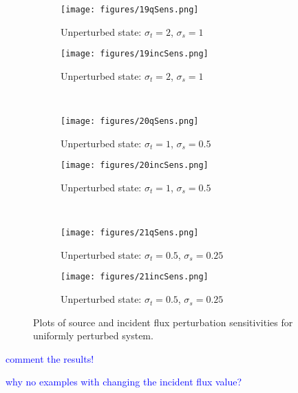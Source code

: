 \documentclass{article}
\newcommand{\sigt}{\sigma_t}
\newcommand{\sigs}{\sigma_s}
\newcommand{\comment}[2]{\marginpar{\textcolor{#2}{$\star$}}\textcolor{#2}{#1}\newline}
\newcommand{\jcr}[1]{\comment{#1}{blue}}
\newcommand{\jcr}[1]{\phantom{a}}
\begin{document}
\begin{figure}[H]
\label{HomoPertq}
\centering
\begin{subfigure}{.5\textwidth}
  \centering
  \texttt{[image: figures/19qSens.png]}
  \caption{Unperturbed state: $\sigt=2$, $\sigs=1$}
  \label{fig:sfig1}
\end{subfigure}%
\begin{subfigure}{.5\textwidth}
  \centering
  \texttt{[image: figures/19incSens.png]}
  \caption{Unperturbed state: $\sigt=2$, $\sigs=1$}
  \label{fig:sfig4}
\end{subfigure}%
\\
\begin{subfigure}{.5\textwidth}
  \centering
  \texttt{[image: figures/20qSens.png]}
  \caption{Unperturbed state: $\sigt=1$, $\sigs=0.5$}
  \label{fig:sfig2}
\end{subfigure}%
\begin{subfigure}{.5\textwidth}
  \centering
  \texttt{[image: figures/20incSens.png]}
  \caption{Unperturbed state: $\sigt=1$, $\sigs=0.5$}
  \label{fig:sfig5}
\end{subfigure}%
\\
\begin{subfigure}{.5\textwidth}
  \centering
  \texttt{[image: figures/21qSens.png]}
  \caption{Unperturbed state: $\sigt=0.5$, $\sigs=0.25$}
  \label{fig:sfig3}
\end{subfigure}%
\begin{subfigure}{.5\textwidth}
  \centering
  \texttt{[image: figures/21incSens.png]}
  \caption{Unperturbed state: $\sigt=0.5$, $\sigs=0.25$}
  \label{fig:sfig6}
\end{subfigure}%
\caption{Plots of source and incident flux perturbation sensitivities for uniformly perturbed system.}
\label{fig:fig}
\end{figure}

\jcr{comment the results!}

\jcr{why no examples with changing the incident flux value?}
\end{document}
